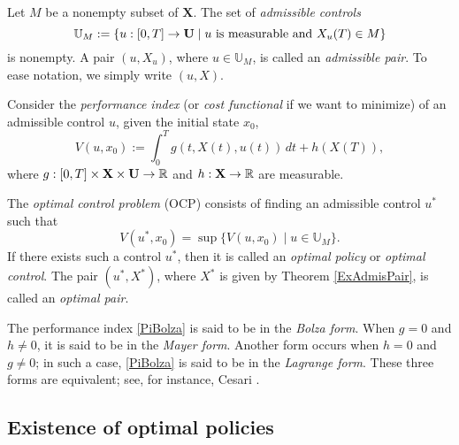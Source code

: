 \begin{assumption} Let $M$ be a nonempty subset of $\mathbf{X}$. 
	The set of {\it admissible controls} 
	\begin{equation}\label{FeasCont}  
		 \mathbb{U}_M:=\{u:[0,T]\to \mathbf{U}\mid u\  
		 \mbox{\rm is measurable and } X_u(T)\in M\} 
	\end{equation}
	is nonempty. A pair $(u,X_u)$, where $u\in \mathbb{U}_M$, is called an 
	{\it admissible pair}. To ease notation, we simply write $(u,X)$.
\end{assumption}


Consider the {\it performance index} (or {\it cost functional} if we want to minimize) of an admissible control $u$, given the initial state $x_0$, 
        \begin{equation}\label{PiBolza} V(u,x_0) := \int_0^Tg(t,X(t),u(t))\,dt + h(X(T)),\end{equation}
where $g:[0,T]\times \mathbf{X}\times \mathbf{U}\to \mathbb{R}$ and $h:\mathbf{X}\to\mathbb{R}$ are measurable.

The {\it optimal control problem} (OCP) consists of finding an admissible control $u^\ast$ such that
\[ V(u^\ast,x_0)=\sup\{ V(u,x_0)\mid u\in \mathbb{U}_M \}.\]
If there exists such a control $u^\ast$, then it is called an {\it optimal policy} or {\it optimal control}. The pair $(u^\ast,X^\ast)$, where $X^\ast$ is given by Theorem \ref{ExAdmisPair}, is called an {\it optimal pair}.



\begin{remark}\rm
The performance index \eqref{PiBolza} is said to be in the {\it Bolza form}. When $g= 0$ and $h\neq 0$, it is said to be in the {\it Mayer form}. Another form occurs when $h= 0$ and $g\neq 0$; in such a case, \eqref{PiBolza} is said to be in the {\it Lagrange form}. These three forms are equivalent; see, for instance, Cesari \cite[Sect. 1.9]{Cesari83}. 
\end{remark} 


\subsection{Existence of optimal policies}

